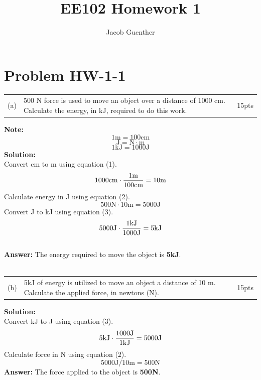 \documentclass{article}
\title{EE102 Homework 1}
\author{Jacob Guenther}
\newcommand{\problemstatement}[3]{
\noindent
\begin{tabular}{ m{0.5cm} m{42em} m{0.5cm} }
	({#1}) & {#2} & {#3}pts
\end{tabular}
}
\begin{document}


\section{Problem HW-1-1}
\problemstatement{a}{500 N force is used to move an object over a distance of 1000 cm. Calculate the energy, in kJ, required to do this work.}{15}
\begin{addmargin}[1.5cm]{0em}
	\noindent
	\textbf{Note:}
	\begin{equation}
	1 \text{m} = 100 \text{cm}
	\end{equation}
	\begin{equation}
	\text{J} = \text{N} \cdot \text{m}
	\end{equation}
	\begin{equation}
	1 \text{kJ} = 1000 \text{J}
	\end{equation}
	\noindent
	\textbf{Solution:} \\
	Convert cm to m using equation (1).
	\[1000 \text{cm} \cdot {1 \text{m} \over 100 \text{cm}} = 10 \text{m}\]
	Calculate energy in J using equation (2).
	\[500 \text{N} \cdot 10 \text{m} = 5000 \text{J} \]
	Convert J to kJ using equation (3).
	\[5000 \text{J} \cdot {1 \text{kJ} \over 1000 \text{J}} = 5 \text{kJ} \] \\
	\noindent
	\textbf{Answer:} The energy required to move the object is \textbf{5kJ}. \\ \\
\end{addmargin}

\newpage
\problemstatement{b}{5kJ of energy is utilized to move an object a distance of 10 m. Calculate the applied force, in newtons (N).}{15}
\begin{addmargin}[1.5cm]{0em}
	\noindent
	\textbf{Solution:} \\
	Convert kJ to J using equation (3).
	\[5 \text{kJ} \cdot {1000 \text{J} \over 1 \text{kJ}} = 5000 \text{J} \]
	Calculate force in N using equation (2).
	\[{5000 \text{J} / 10 \text{m}} = 500 \text{N} \]
	\noindent
	\textbf{Answer:} The force applied to the object is \textbf{500N}. \\ \\
\end{addmargin}
\end{document}
